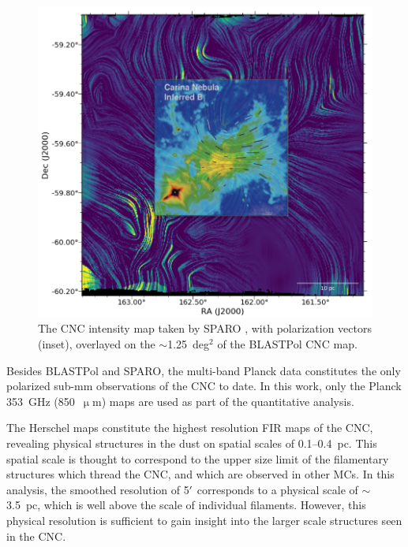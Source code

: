 \begin{figure}[!htbp]
\centering
\includegraphics[width=\textwidth]{figures/carina/lic_sparo_overlay}
\caption[The CNC intensity map taken by SPARO overlayed on the  of the BLASTPol CNC map.]{The CNC intensity map taken by SPARO \citep{li2006results}, with polarization vectors (inset), overlayed on the $\sim$1.25~deg$^{2}$ of the BLASTPol CNC map.}
\label{fig:lic_sparo_overlay}
\end{figure}

Besides BLASTPol and SPARO, the multi-band Planck data constitutes the only polarized sub-mm observations of the CNC to date. In this work, only the Planck 353~GHz (850~$\upmu$m) maps are used as part of the quantitative analysis.

The Herschel maps constitute the highest resolution FIR maps of the CNC, revealing physical structures in the dust on spatial scales of 0.1--0.4~pc. This spatial scale is thought to correspond to the upper size limit of the filamentary structures which thread the CNC, and which are observed in other MCs. In this analysis, the smoothed resolution of 5$\operatorname{^{\prime}}$ corresponds to a physical scale of $\sim$3.5~pc, which is well above the scale of individual filaments. However, this physical resolution is sufficient to gain insight into the larger scale structures seen in the CNC\@.

